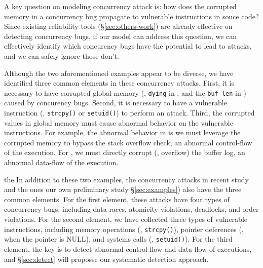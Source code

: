 A key question on modeling concurrency attack is: how does the corrupted memory 
in a concurrency bug propagate to vulnerable instructions in souce code? Since 
existing reliability tools (\S\ref{sec:others-work}) are already effective on 
detecting concurrency bugs, if our model can address this question, we can 
effectively identify which concurency bugs have the potential to lead to 
attacks, and we can safely ignore those don't.

Although the two aforementioned examples appear to be diverse, we have 
identified three common elements in these concurrency attacks. First, it is 
necessary to have corrupted global memory (\eg, \texttt{dying} in \libsafe, and 
the \texttt{buf\_len} in \apache) caused by concurency bugs. Second, it is 
necessary to have a vulnerable instruction (\eg, \texttt{strcpy()} or 
\texttt{setuid()}) to perform an attack. Third, the corrupted values in global 
memory must cause abnormal behavior on the vulnerable instructions. For 
example, the abnormal behavior in \libsafe is we must leverage the corrupted 
memory to bypass the stack overflow check, an abnormal control-flow of the 
execution. For \apache, we must directly corrupt (\ie, overflow) the buffer 
log, an abnormal data-flow of the execution.

the %
% 
In addition to these two examples, the \nattacks concurrency attacks in recent 
study~\cite{con:hotpar12} and the \noldattacks ones our own preliminary study 
\S\ref{sec:examples}) also have the three common elements. For the first 
element, these attacks have four types of concurrency bugs, including data 
races, atomicity violations, deadlocks, and order violations. For the second 
element, we have collected three types of vulnerable instructions, including 
memory operations (\eg, \texttt{strcpy()}), pointer deferences (\eg, when the 
pointer is NULL), and systems calls (\eg, \texttt{setuid()}). For the third 
element, the key is to detect abnormal control-flow and data-flow of 
executions, and \S\ref{sec:detect} will proposse our systematic detection 
approach.

